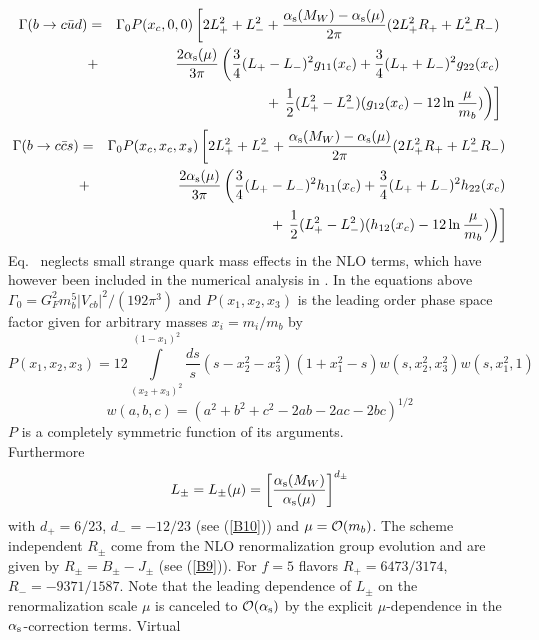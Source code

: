 \begin{eqnarray}\label{bcud}
\Gamma(b\to c\bar ud)&=&\Gamma_0 P(x_c,0,0)\left[2L^2_++L^2_-+
 \frac{\alpha_{\rm s}(M_W)-\alpha_{\rm s}(\mu)}{2\pi}(2L^2_+ R_++L^2_- R_-)\right.
\nonumber\\
 &+&\frac{2\alpha_{\rm s}(\mu)}{3\pi}\left(\frac{3}{4}(L_+-L_-)^2 
g_{11}(x_c)+\frac{3}{4}(L_++L_-)^2g_{22}(x_c)\right.
\nonumber\\
&&+\left.\left.\frac{1}{2}
(L^2_+-L^2_-)(g_{12}(x_c)-12 \ln\frac{\mu}{m_b})\right)\right]
\end{eqnarray}
\begin{eqnarray}\label{bccs}
\Gamma(b\to c\bar cs)&=&\Gamma_0 P(x_c,x_c,x_s)\left[2L^2_++L^2_-+
 \frac{\alpha_{\rm s}(M_W)-\alpha_{\rm s}(\mu)}{2\pi}(2L^2_+ R_++L^2_- R_-)\right.
\nonumber\\
 &+&\frac{2\alpha_{\rm s}(\mu)}{3\pi}\left(\frac{3}{4}(L_+-L_-)^2 
h_{11}(x_c)+\frac{3}{4}(L_++L_-)^2h_{22}(x_c)\right.
\nonumber\\
&&+\left.\left.\frac{1}{2}
(L^2_+-L^2_-)(h_{12}(x_c)-12 \ln\frac{\mu}{m_b})\right)\right]
\end{eqnarray}
Eq.\  neglects small strange quark mass effects in the NLO
terms, which have however been included in the numerical analysis in
\cite{baganetal:95}.
In the equations above $\Gamma_0=G^2_Fm^5_b|V_{cb}|^2/(192\pi^3)$ and
$P(x_1,x_2,x_3)$ is the leading order phase space factor given for
arbitrary masses $x_i=m_i/m_b$ by
\begin{equation}\label{px123}
P(x_1,x_2,x_3)=12\int\limits_{(x_2+x_3)^2}^{(1-x_1)^2} \frac{ds}{s}
(s-x^2_2-x^2_3)(1+x^2_1-s) w(s,x^2_2,x^2_3) w(s,x^2_1,1)
\end{equation}
\begin{equation}\label{wabc}
w(a,b,c)=(a^2+b^2+c^2-2ab-2ac-2bc)^{1/2}
\end{equation}
$P$ is a completely symmetric function of its arguments.
\\
Furthermore
\begin{equation}\label{lpmmu}
L_\pm=L_\pm(\mu)=\left[\frac{\alpha_{\rm s}(M_W)}{\alpha_{\rm s}(\mu)}
\right]^{d_\pm}
\end{equation}
with $d_+=6/23$, $d_-=-12/23$ (see (\ref{B10})) and $\mu={\cal
O}(m_b)$.  The scheme independent $R_\pm$ come from the NLO
renormalization group evolution and are given by $R_\pm=B_\pm-J_\pm$
(see (\ref{B9})).  For $f=5$ flavors $R_+=6473/3174$,
$R_-=-9371/1587$.  Note that the leading dependence of $L_\pm$ on the
renormalization scale $\mu$ is canceled to ${\cal O}(\alpha_{\rm s})$ by the
explicit $\mu$-dependence in the $\alpha_{\rm s}$-correction terms.  Virtual
